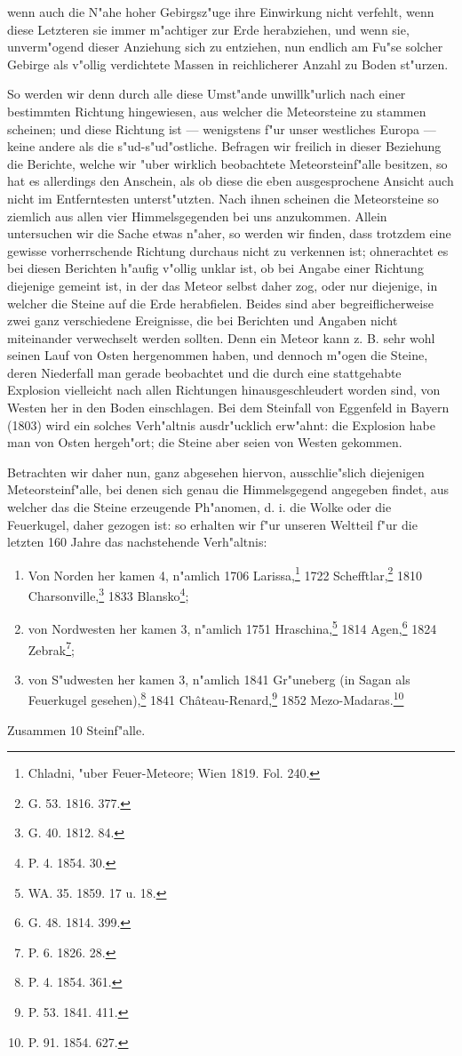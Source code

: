 \documentclass[a4paper, 8pt, oneside, polutonikogreek, german]{article}
\begin{document}
wenn auch die N"ahe hoher Gebirgsz"uge ihre Einwirkung nicht verfehlt, wenn diese Letzteren sie immer m"achtiger zur Erde herabziehen, und wenn sie, unverm"ogend dieser Anziehung sich zu entziehen, nun endlich am Fu"se solcher Gebirge als v"ollig verdichtete Massen in reichlicherer Anzahl zu Boden st"urzen.

So werden wir denn durch alle diese Umst"ande unwillk"urlich nach einer bestimmten Richtung hingewiesen, aus welcher die Meteorsteine zu stammen scheinen; und diese Richtung ist --- wenigstens f"ur unser westliches Europa --- keine andere als die s"ud-s"ud"ostliche. Befragen wir freilich in dieser Beziehung die Berichte, welche wir "uber wirklich beobachtete Meteorsteinf"alle besitzen, so hat es allerdings den Anschein, als ob diese die eben ausgesprochene Ansicht auch nicht im Entferntesten unterst"utzten. Nach ihnen scheinen die Meteorsteine so ziemlich aus allen vier Himmelsgegenden bei uns anzukommen. Allein untersuchen wir die Sache etwas n"aher, so werden wir finden, dass trotzdem eine gewisse vorherrschende Richtung durchaus nicht zu verkennen ist; ohnerachtet es bei diesen Berichten h"aufig v"ollig unklar ist, ob bei Angabe einer Richtung diejenige gemeint ist, in der das Meteor selbst daher zog, oder nur diejenige, in welcher die Steine auf die Erde herabfielen. Beides sind aber begreiflicherweise zwei ganz verschiedene Ereignisse, die bei Berichten und Angaben nicht miteinander verwechselt werden sollten. Denn ein Meteor kann z. B. sehr wohl seinen Lauf von Osten hergenommen haben, und dennoch m"ogen die Steine, deren Niederfall man gerade beobachtet und die durch eine stattgehabte Explosion vielleicht nach allen Richtungen hinausgeschleudert worden sind, von Westen her in den Boden einschlagen. Bei dem Steinfall von Eggenfeld in Bayern (1803) wird ein solches Verh"altnis ausdr"ucklich erw"ahnt: die Explosion habe man von Osten hergeh"ort; die Steine aber seien von Westen gekommen.

Betrachten wir daher nun, ganz abgesehen hiervon, ausschlie"slich diejenigen Meteorsteinf"alle, bei denen sich genau die Himmelsgegend angegeben findet, aus welcher das die Steine erzeugende Ph"anomen, d. i. die Wolke oder die Feuerkugel, daher gezogen ist: so erhalten wir f"ur unseren Weltteil f"ur die letzten 160 Jahre das nachstehende Verh"altnis:
\begin{enumerate}
    \item Von Norden her kamen 4, n"amlich 1706 Larissa,\footnote{Chladni, "uber Feuer-Meteore; Wien 1819. Fol. 240.} 1722 Schefftlar,\footnote{G. 53. 1816. 377.} 1810 Charsonville,\footnote{G. 40. 1812. 84.} 1833 Blansko\footnote{P. 4. 1854. 30.};
    \item von Nordwesten her kamen 3, n"amlich 1751 Hraschina,\footnote{WA. 35. 1859. 17 u. 18.} 1814 Agen,\footnote{G. 48. 1814. 399.} 1824 Zebrak\footnote{P. 6. 1826. 28.};
    \item von S"udwesten her kamen 3, n"amlich 1841 Gr"uneberg (in Sagan als Feuerkugel gesehen),\footnote{P. 4. 1854. 361.} 1841 Château-Renard,\footnote{P. 53. 1841. 411.} 1852 Mezo-Madaras.\footnote{P. 91. 1854. 627.}
\end{enumerate}
\begin{center}
Zusammen 10 Steinf"alle.
\end{center}
\end{document}
